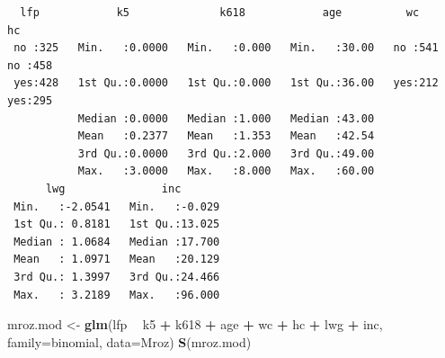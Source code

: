 \documentclass[
]{article}
\newenvironment{Shaded}{\begin{snugshade}}{\end{snugshade}}
\newcommand{\DataTypeTok}[1]{\textcolor[rgb]{0.13,0.29,0.53}{#1}}
\newcommand{\KeywordTok}[1]{\textcolor[rgb]{0.13,0.29,0.53}{\textbf{#1}}}
\newcommand{\NormalTok}[1]{#1}
\newcommand{\OperatorTok}[1]{\textcolor[rgb]{0.81,0.36,0.00}{\textbf{#1}}}
\newcommand{\StringTok}[1]{\textcolor[rgb]{0.31,0.60,0.02}{#1}}
\begin{document}
\begin{verbatim}
  lfp            k5              k618            age          wc        hc     
 no :325   Min.   :0.0000   Min.   :0.000   Min.   :30.00   no :541   no :458  
 yes:428   1st Qu.:0.0000   1st Qu.:0.000   1st Qu.:36.00   yes:212   yes:295  
           Median :0.0000   Median :1.000   Median :43.00                      
           Mean   :0.2377   Mean   :1.353   Mean   :42.54                      
           3rd Qu.:0.0000   3rd Qu.:2.000   3rd Qu.:49.00                      
           Max.   :3.0000   Max.   :8.000   Max.   :60.00                      
      lwg               inc        
 Min.   :-2.0541   Min.   :-0.029  
 1st Qu.: 0.8181   1st Qu.:13.025  
 Median : 1.0684   Median :17.700  
 Mean   : 1.0971   Mean   :20.129  
 3rd Qu.: 1.3997   3rd Qu.:24.466  
 Max.   : 3.2189   Max.   :96.000  
\end{verbatim}

\begin{Shaded}
\begin{Highlighting}[]
\NormalTok{mroz.mod <-}\StringTok{ }\KeywordTok{glm}\NormalTok{(lfp }\OperatorTok{~}\StringTok{ }\NormalTok{k5 }\OperatorTok{+}\StringTok{ }\NormalTok{k618 }\OperatorTok{+}\StringTok{ }\NormalTok{age }\OperatorTok{+}\StringTok{ }\NormalTok{wc }\OperatorTok{+}\StringTok{ }\NormalTok{hc }\OperatorTok{+}\StringTok{ }\NormalTok{lwg }\OperatorTok{+}\StringTok{ }\NormalTok{inc, }\DataTypeTok{family=}\NormalTok{binomial, }\DataTypeTok{data=}\NormalTok{Mroz)}
\KeywordTok{S}\NormalTok{(mroz.mod)}
\end{Highlighting}
\end{Shaded}
\end{document}
